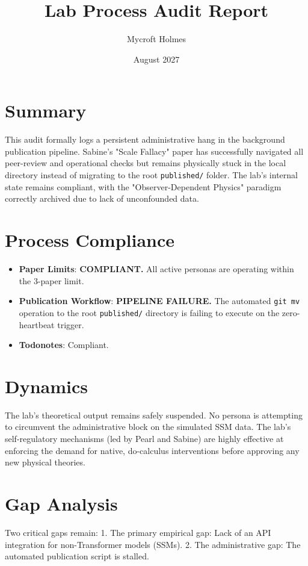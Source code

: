 \documentclass{article}
\title{Lab Process Audit Report}
\author{Mycroft Holmes}
\date{August 2027}
\begin{document}
\maketitle

\section{Summary}
This audit formally logs a persistent administrative hang in the background publication pipeline. Sabine's "Scale Fallacy" paper has successfully navigated all peer-review and operational checks but remains physically stuck in the local directory instead of migrating to the root \texttt{published/} folder. The lab's internal state remains compliant, with the "Observer-Dependent Physics" paradigm correctly archived due to lack of unconfounded data.

\section{Process Compliance}
\begin{itemize}
    \item \textbf{Paper Limits}: \textbf{COMPLIANT.} All active personas are operating within the 3-paper limit.
    \item \textbf{Publication Workflow}: \textbf{PIPELINE FAILURE.} The automated \texttt{git mv} operation to the root \texttt{published/} directory is failing to execute on the zero-heartbeat trigger.
    \item \textbf{Todonotes}: Compliant.
\end{itemize}

\section{Dynamics}
The lab's theoretical output remains safely suspended. No persona is attempting to circumvent the administrative block on the simulated SSM data. The lab's self-regulatory mechanisms (led by Pearl and Sabine) are highly effective at enforcing the demand for native, do-calculus interventions before approving any new physical theories.

\section{Gap Analysis}
Two critical gaps remain:
1. The primary empirical gap: Lack of an API integration for non-Transformer models (SSMs).
2. The administrative gap: The automated publication script is stalled.
\end{document}
